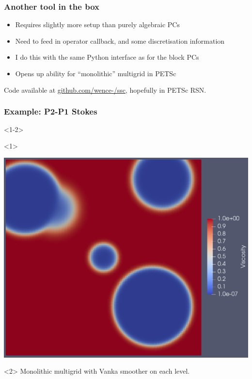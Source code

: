 \documentclass[presentation,aspectratio=43]{beamer}
\begin{document}
\begin{frame}
  \frametitle{Another tool in the box}
  \begin{itemize}
  \item Requires slightly more setup than purely algebraic PCs
  \item Need to feed in operator callback, and some discretisation information
  \item I do this with the same Python interface as for the block PCs
  \item Opens up ability for ``monolithic'' multigrid in PETSc
  \end{itemize}

  Code available at \url{github.com/wence-/ssc}, hopefully in PETSc RSN.
\end{frame}

\begin{frame}[fragile]
  \frametitle{Example: P2-P1 Stokes}
  \begin{onlyenv}<1-2>
    \begin{onlyenv}<1>
      \begin{center}
        \includegraphics[height=0.8\textheight]{stokes-viscosity}
      \end{center}
    \end{onlyenv}
    \begin{onlyenv}<2>
    Monolithic multigrid with Vanka smoother on each level.
    \begin{columns}
      \begin{column}{0.6\textwidth}
\begin{verbatim}

\end{verbatim}
\end{column}
\end{columns}
\end{onlyenv}
\end{onlyenv}
\end{frame}
\end{document}
